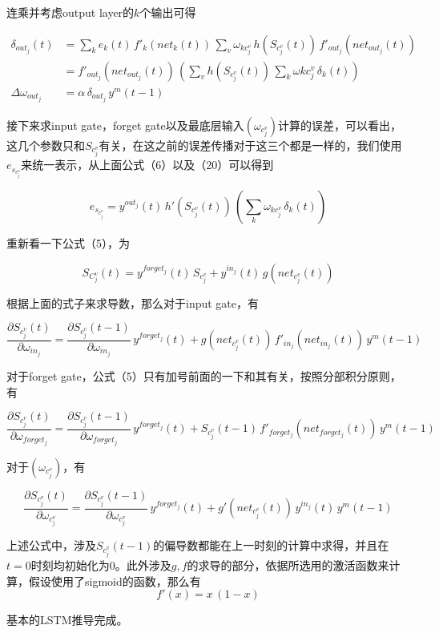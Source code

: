 \documentclass[UTF8]{ctexart}
\begin{document}
连乘并考虑output layer的$k$个输出可得

\begin{align}
\delta_{out_j}(t) &= \sum_k e_k(t) \, {f'}_k(net_k(t)) \, \sum_v\omega_{kc^v_j} \, h(S_{c^v_j}(t)) \, {f'}_{out_j}(net_{out_j}(t)) \\
&= {f'}_{out_j}(net_{out_j}(t)) \, (\sum_v h(S_{c^v_j}(t)) \, \sum_k\omega{kc^v_j} \, \delta_k(t)) \\
\Delta \omega_{out_j} &= \alpha \, \delta_{out_j} \, y^m(t-1)
\end{align}

接下来求input gate，forget gate以及最底层输入$(\omega_{c^v_j})$计算的误差，可以看出，这几个参数只和$S_{c^v_j}$有关，在这之前的误差传播对于这三个都是一样的，我们使用$e_{s_{c^v_j}}$来统一表示，从上面公式（6）以及（20）可以得到

\begin{equation}
e_{s_{c^v_j}} = y^{out_j}(t) \, {h'}(S_{c^v_j}(t)) \, (\sum_k\omega_{kc^v_j} \, \delta_k(t))
\end{equation}

重新看一下公式（5），为

\begin{equation*}
S_{C^v_j}(t) = y^{forget_j}(t) \, S_{c^v_j} + y^{in_j}(t) \, g(net_{c^v_j}(t))
\end{equation*}

根据上面的式子来求导数，那么对于input gate，有

\begin{equation}
\frac{\partial S_{c^v_j}(t)} {\partial \omega_{in_j}} = \frac{\partial S_{c^v_j}(t-1)} {\partial \omega_{in_j}} \, y^{forget_j}(t) + g(net_{c^v_j}(t)) \, {f'}_{in_j}(net_{in_j}(t)) \, y^m(t-1)
\end{equation}

对于forget gate，公式（5）只有加号前面的一下和其有关，按照分部积分原则，有

\begin{equation}
\frac{\partial S_{c^v_j}(t)} {\partial \omega_{forget_j}} =  \frac{\partial S_{c^v_j}(t-1)} {\partial \omega_{forget_j}} \, y^{forget_j}(t) + S_{c^v_j}(t-1) \, {f'}_{forget_j}(net_{forget_j}(t)) \, y^m(t-1)
\end{equation}

对于$(\omega_{c^v_j})$，有

\begin{equation}
\frac{\partial S_{c^v_j}(t)} {\partial \omega_{c^v_j}} =  \frac{\partial S_{c^v_j}(t-1)} {\partial \omega_{c^v_j}} \, y^{forget_j}(t) + g'(net_{c^v_j}(t)) \, y^{in_j}(t) \, y^m(t-1)
\end{equation}

上述公式中，涉及$S_{c^v_j}(t-1)$的偏导数都能在上一时刻的计算中求得，并且在$t = 0$时刻均初始化为0。此外涉及$g, f$的求导的部分，依据所选用的激活函数来计算，假设使用了sigmoid的函数，那么有
\begin{equation}
f'(x) = x \, (1-x)
\end{equation}

基本的LSTM推导完成。
\end{document}
